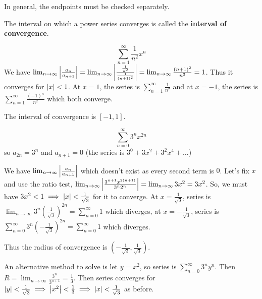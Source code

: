 \documentclass{article}
\begin{document}
\begin{remark}
  In general, the endpoints must be checked separately.
\end{remark}
\begin{definition}
  The interval on which a power series converges is called the \textbf{interval of convergence}.
\end{definition}
\begin{example}
  \[
    \sum_{n=1}^\infty \frac{1}{n^2} x^n
  \] We have $\lim_{n\to\infty} \abs{\frac{a_n}{a_{n+1}}} = \lim_{n\to\infty} \abs{\frac{\frac{1}{n^2}}{\frac{1}{(n+1)^2}}} = \lim_{n\to\infty} \frac{(n+1)^2}{n^2} = 1$. Thus it converges for $\abs{x} < 1$. At $x=1$, the series is $\sum_{n=1}^\infty \frac{1}{n^2}$ and at $x=-1$, the series is $\sum_{n=1}^\infty \frac{(-1)^n}{n^2}$ which both converge.

  The interval of convergence is $[-1, 1]$.
\end{example}
\begin{example}
  \[
    \sum_{n=0}^\infty 3^nx^{2n}
  \] so $a_{2n} = 3^n$ and $a_{n+1} = 0$ (the series is $3^0 + 3x^2 + 3^2x^4 + \dots$)

  We have $\lim_{n\to\infty} \abs{\frac{a_n}{a_{n+1}}}$ which doesn't exist as every second term is $0$. Let's fix $x$ and use the ratio test,
  $\lim_{n\to\infty} \abs{\frac{3^{n+1}x^{2(n+1)}}{3^n2^n}} = \lim_{n\to\infty} 3x^2 = 3x^2$. So, we must have $3x^2 < 1 \implies \abs{x} < \frac{1}{\sqrt{3}}$ for it to converge. At $x=\frac{1}{\sqrt{3}}$, series is $\lim_{n\to\infty} 3^n\left(\frac{1}{\sqrt{3}}\right)^{2n} = \sum_{n=0}^\infty 1$ which diverges, at $x = -\frac{1}{\sqrt{3}}$, series is $\sum_{n=0}^\infty 3^n \left(-\frac{1}{\sqrt{3}}\right)^{2n} = \sum_{n=0}^\infty 1$ which diverges.

  Thus the radius of convergence is $\left(-\frac{1}{\sqrt{3}}, \frac{1}{\sqrt{3}}\right)$.\

  An alternative method to solve is let $y =x^2$, so series is $\sum_{n=0}^\infty 3^ny^n$. Then $R = \lim_{n\to\infty} \frac{3^n}{3^{n+1}} = \frac{1}{3}$. Then series converges for $\abs{y} < \frac{1}{\sqrt{3}} \implies \abs{x^2} < \frac{1}{3} \implies \abs{x} < \frac{1}{\sqrt{3}}$ as before.
\end{example}
\end{document}
